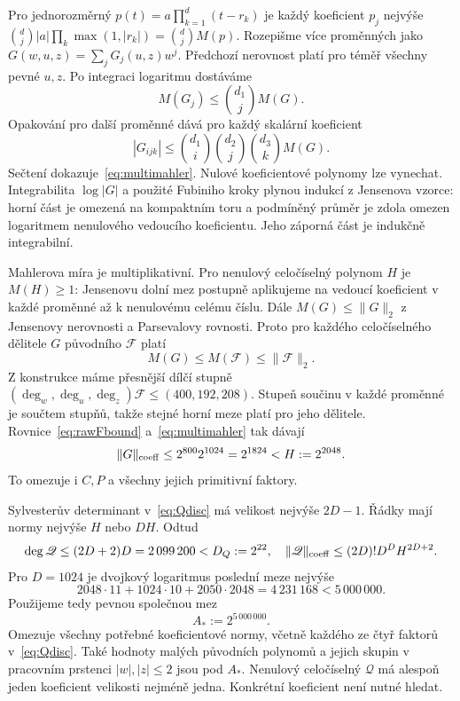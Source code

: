 \documentclass[11pt,a4paper]{article}
\theoremstyle{remark}\newtheorem{remark}[theorem]{Poznámka}
\numberwithin{equation}{section}
\begin{document}
Pro jednorozměrný \(p(t)=a\prod_{k=1}^d(t-r_k)\) je každý koeficient \(p_j\) nejvýše
\(\binom dj |a|\prod_k\max(1,|r_k|)=\binom dj M(p)\).
Rozepišme více proměnných jako \(G(w,u,z)=\sum_jG_j(u,z)w^j\). Předchozí nerovnost platí pro téměř všechny pevné \(u,z\). Po integraci logaritmu dostáváme
\[
M(G_j)\le\binom{d_1}j M(G).
\]
Opakování pro další proměnné dává pro každý skalární koeficient
\[
|G_{ijk}|\le
\binom{d_1}i\binom{d_2}j\binom{d_3}k M(G).
\]
Sečtení dokazuje~\eqref{eq:multimahler}. Nulové koeficientové polynomy lze vynechat. Integrabilita \(\log|G|\) a použité Fubiniho kroky plynou indukcí z Jensenova vzorce: horní část je omezená na kompaktním toru a podmíněný průměr je zdola omezen logaritmem nenulového vedoucího koeficientu. Jeho záporná část je indukčně integrabilní.

Mahlerova míra je multiplikativní. Pro nenulový celočíselný polynom \(H\) je \(M(H)\ge1\): Jensenovu dolní mez postupně aplikujeme na vedoucí koeficient v každé proměnné až k nenulovému celému číslu. Dále \(M(G)\le\|G\|_2\) z Jensenovy nerovnosti a Parsevalovy rovnosti. Proto pro každého celočíselného dělitele \(G\) původního \(\mathscr F\) platí
\[
M(G)\le M(\mathscr F)\le\|\mathscr F\|_2.
\]
Z konstrukce máme přesnější dílčí stupně
\((\deg_w,\deg_u,\deg_z)\mathscr F\le(400,192,208)\).
Stupeň součinu v každé proměnné je součtem stupňů, takže stejné horní meze platí pro jeho dělitele. Rovnice~\eqref{eq:rawFbound} a~\eqref{eq:multimahler} tak dávají
\begin{equation}
\|G\|_{\rm coeff}\le2^{800}2^{1024}=2^{1824}<H:=2^{2048}.
\label{eq:factorheight}
\end{equation}
To omezuje i \(C,P\) a všechny jejich primitivní faktory.

Sylvesterův determinant v~\eqref{eq:Qdisc} má velikost nejvýše \(2D-1\). Řádky mají normy nejvýše \(H\) nebo \(DH\). Odtud
\[
\deg\mathscr Q\le(2D+2)D=2\,099\,200<D_Q:=2^{22},
\quad
\|\mathscr Q\|_{\rm coeff}\le(2D)!D^D H^{2D+2}.
\]
Pro \(D=1024\) je dvojkový logaritmus poslední meze nejvýše
\[
2048\cdot11+1024\cdot10+2050\cdot2048
=4\,231\,168<5\,000\,000.
\]
Použijeme tedy pevnou společnou mez
\begin{equation}
\boxed{A_*:=2^{5\,000\,000}.}
\label{eq:Astar}
\end{equation}
Omezuje všechny potřebné koeficientové normy, včetně každého ze čtyř faktorů v~\eqref{eq:Qdisc}. Také hodnoty malých původních polynomů a jejich skupin v pracovním prstenci \(|w|,|z|\le2\) jsou pod \(A_*\). Nenulový celočíselný \(\mathscr Q\) má alespoň jeden koeficient velikosti nejméně jedna. Konkrétní koeficient není nutné hledat.
\end{document}
